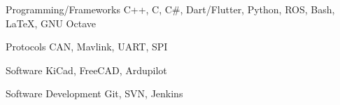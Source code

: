 

\begin{cvskills}

  \cvskill
    {Programming/Frameworks} %
    {C++, C, C\#, Dart/Flutter, Python, ROS, Bash, LaTeX, GNU Octave} %

  \cvskill
    {Protocols} %
    {CAN, Mavlink, UART, SPI} %

  \cvskill
    {Software} %
    {KiCad, FreeCAD, Ardupilot} %

  \cvskill
    {Software Development} %
    {Git, SVN, Jenkins} %

\end{cvskills}
